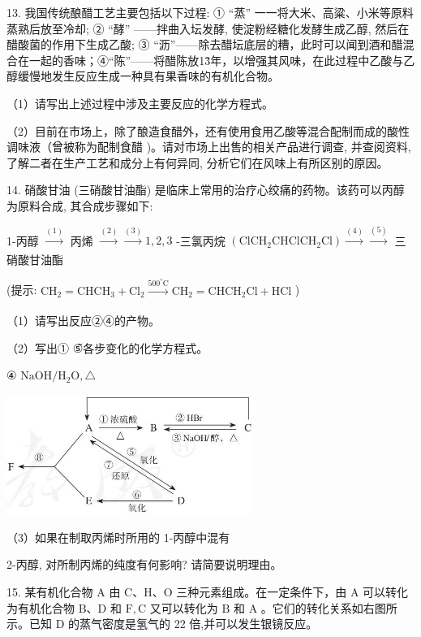 \documentclass[10pt]{article}
\begin{document}
13. 我国传统酿醋工艺主要包括以下过程: ① “蒸” 一一将大米、高粱、小米等原料蒸熟后放至冷却; ② “酵” ——拌曲入坛发酵, 使淀粉经糖化发酵生成乙醇, 然后在醋酸菌的作用下生成乙酸; ③ “沥”——除去醋坛底层的糟，此时可以闻到酒和醋混合在一起的香味；④“陈”——将醋陈放1\~3年，以增强其风味，在此过程中乙酸与乙醇缓慢地发生反应生成一种具有果香味的有机化合物。

（1）请写出上述过程中涉及主要反应的化学方程式。

（2）目前在市场上，除了酿造食醋外，还有使用食用乙酸等混合配制而成的酸性调味液（曾被称为配制食醋 )。请对市场上出售的相关产品进行调查, 并查阅资料, 了解二者在生产工艺和成分上有何异同, 分析它们在风味上有所区别的原因。

14. 硝酸甘油 (三硝酸甘油酯) 是临床上常用的治疗心绞痛的药物。该药可以丙醇为原料合成, 其合成步骤如下:

1-丙醇 \(\overset{\left( 1\right) }{ \rightarrow }\) 丙烯 \(\overset{\left( 2\right) }{ \rightarrow }\overset{\left( 3\right) }{ \rightarrow }1,2,3\) -三氯丙烷 \(\left( {{\mathrm{{ClCH}}}_{2}{\mathrm{{CHClCH}}}_{2}\mathrm{{Cl}}}\right) \xrightarrow[]{\left( 4\right) }\overset{\left( 5\right) }{ \rightarrow }\) 三硝酸甘油酯

(提示: \({\mathrm{{CH}}}_{2} = {\mathrm{{CHCH}}}_{3} + {\mathrm{{Cl}}}_{2}\xrightarrow[]{{500}^{ \circ }\mathrm{C}}{\mathrm{{CH}}}_{2} = {\mathrm{{CHCH}}}_{2}\mathrm{{Cl}} + \mathrm{{HCl}}\) )

（1）请写出反应②④的产物。

（2）写出① \~⑤各步变化的化学方程式。

④ \(\mathrm{{NaOH}}/{\mathrm{H}}_{2}\mathrm{O},\bigtriangleup\)

\begin{center}
\includegraphics[max width=0.6\textwidth]{images/0190efc5-b58a-7c43-bfb0-e0a030df9cfd_101_437841.jpg}
\end{center}

（3）如果在制取丙烯时所用的 1-丙醇中混有

2-丙醇, 对所制丙烯的纯度有何影响? 请简要说明理由。

15. 某有机化合物 \(\mathrm{A}\) 由 \(\mathrm{C}\text{、}\mathrm{H}\text{、}\mathrm{O}\) 三种元素组成。在一定条件下，由 \(\mathrm{A}\) 可以转化为有机化合物 \(\mathrm{B}\text{、}\mathrm{D}\) 和 \(\mathrm{F},\mathrm{C}\) 又可以转化为 \(\mathrm{B}\) 和 \(\mathrm{A}\) 。它们的转化关系如右图所示。已知 \(\mathrm{D}\) 的蒸气密度是氢气的 22 倍,并可以发生银镜反应。
\end{document}
